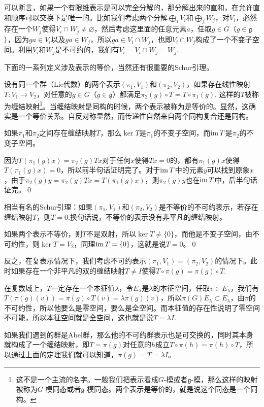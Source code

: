 \documentclass[10pt]{article}
\newcommand{\lag}{{\mathfrak{g}}}
\begin{document}
\para 可以断言，如果一个有限维表示是可以完全分解的，那分解出来的直和，在允许直和顺序可以交换下是唯一的。比如我们考虑两个分解$\bigoplus_i V_i$和$\bigoplus_j W_j$，对$V_i$，必然存在一个$W_j$使得$V_i\cap W_j\neq \varnothing$，然后考虑这里面的任意元素$a$，任取$g\in G$（$g\in\lag$），因为$ga\in V_i$以及$ga\in W_j$，所以$ga\in V_i\cap W_j$，也即$V_i\cap W_j$构成了一个不变子空间。利用$V_i$和$W_j$是不可约的，我们有$V_i=V_i\cap W_j=W_j$.

下面的一系列定义涉及表示的等价，当然还有很重要的Schur引理。

\para 设有同一个群（Lie代数）的两个表示$(\pi_1,V_1)$和$(\pi_2,V_2)$，如果存在线性映射$T:V_1\to V_2$，对任意的$g\in G$（$g\in \lag$）都满足$\pi_2(g)\circ T=T\circ \pi_1(g)$. 这样的$T$被称为缠结映射\footnote{这不是一个主流的名字。一般我们把表示看成$G$-模或者$\lag$-模，那么这样的映射被称为$G$-模同态或者$\lag$-模同态。两个表示是等价的，就是说这个同态是一个同构。}。当缠结映射是同构的时候，两个表示被称为是等价的。显然，这确实是一个等价关系。自反对称显然，而传递性自然来自两个同构复合还是同构。

\lem 如果$\pi_1$和$\pi_2$之间存在缠结映射$T$，那么$\ker T$是$\pi_1$的不变子空间，而$\operatorname{im} T$是$\pi_2$的不变子空间。

\proof 因为$T(\pi_1(g)x)=\pi_2(g)Tx$对于任何$x$使得$Tx=0$的，都有$\pi_1(g)x$使得$T(\pi_1(g)x)=0$，所以前半句话证明完了。对于$\operatorname{im} T$中的元素$y$可以找到原象$x$，由于$\pi_2(g)y=\pi_2(g)Tx=T(\pi_1(g)x)$，则$\pi_2(g)y$也在$\operatorname{im} T$中，后半句话证完。\qed

\lem 相当有名的Schur引理：如果$(\pi_1,V_1)$和$(\pi_2,V_2)$是不等价的不可约表示，若存在缠结映射$T$，则$T=0$.换句话说，不等价的表示没有非平凡的缠结映射。

\proof 如果两个表示不等价，则$T$不是双射，所以$\ker T\neq \{0\}$，而他是不变子空间，由不可约性，则$\ker T= V_2$，同理$\operatorname{im}  T= \{0\}$，这就是说$T=0$。\qed

\para 反之，在复表示情况下，我们考虑不可约表示$(\pi_1,V_1)=(\pi_2,V_2)$的情况下。此时如果存在一个非平凡的双的缠结映射$T\neq I$使得$T\circ \pi(g)=\pi(g)\circ T$.

在复数域上，$T$一定存在一个本征值$\lambda$，令$E_\lambda$是$\lambda$的本征空间，任取$v\in E_\lambda$，我们有$T(\pi(g)(v))=\pi(g)\circ T(v)=\lambda\pi(g)(v)$，所以$\pi(G)E_\lambda\subset E_\lambda$，由$\pi$的不可约性，所以他要么是零空间，要么是全空间。而本征值的存在性说明了零空间不可能，所以本征空间就是全空间，这也就是说$T=\lambda I$.

\para 如果我们遇到的群是Abel群，那么他的不可约群表示也是可交换的，同时其本身就构成了一个缠结映射，即$T=\pi(g)$对任意的$h$成立$T\circ \pi(h)=\pi(h)\circ T$，所以通过上面的定理我们就可以知道，$\pi(g)=T=\lambda I$。
\end{document}
